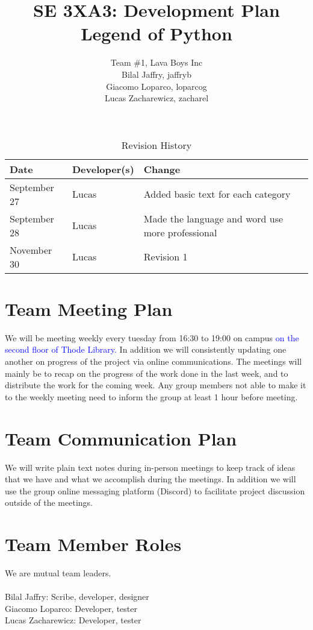 \documentclass{article}
\title{SE 3XA3: Development Plan\\Legend of Python}
\author{Team \#1, Lava Boys Inc
		\\ Bilal Jaffry, jaffryb
		\\ Giacomo Loparco, loparcog
		\\ Lucas Zacharewicz, zacharel
}
\date{}
\begin{document}
\begin{table}[hp]
\caption{Revision History} \label{TblRevisionHistory}
\begin{tabularx}{\textwidth}{llX}
\toprule
\textbf{Date} & \textbf{Developer(s)} & \textbf{Change}\\
\midrule
September 27 & Lucas & Added basic text for each category\\
September 28 & Lucas & Made the language and word use more professional\\
November 30 & Lucas & Revision 1\\ 
\bottomrule
\end{tabularx}
\end{table}

\newpage

\maketitle

\section{Team Meeting Plan}

	We will be meeting weekly every tuesday from 16:30 to 19:00 on campus \textcolor{blue}{on the second floor of Thode Library.} In addition we will consistently updating one another on progress of the project via online communications. The meetings will mainly be to recap on the progress of the work done in the last week, and to distribute the work for the coming week. Any group members not able to make it to the weekly meeting need to inform the group at least 1 hour before meeting.

\section{Team Communication Plan}

We will write plain text notes during in-person meetings to keep track of ideas that we have and what we accomplish during the meetings. In addition we will use the group online messaging platform (Discord) to facilitate project discussion outside of the meetings.

\section{Team Member Roles}

We are mutual team leaders.\\ \\
Bilal Jaffry: Scribe, developer, designer\\
Giacomo Loparco: Developer, tester\\
Lucas Zacharewicz: Developer, tester\\
\end{document}
